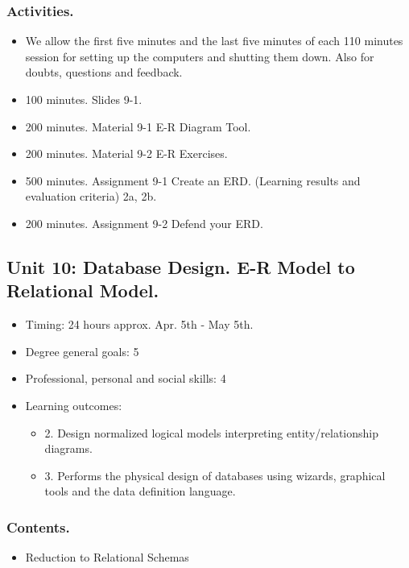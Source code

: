 \documentclass[catalan, a4paper, 12pt, titlepage]{article}
\begin{document}
  \subsubsection{Activities.}
  \begin{itemize}
          \item We allow the first five minutes and the last five minutes of each 110 minutes session for setting up the computers and shutting them down. Also for doubts, questions and feedback.
	  \item 100 minutes. Slides 9-1.
	  \item 200 minutes. Material 9-1 E-R Diagram Tool.
	  \item 200 minutes. Material 9-2 E-R Exercises.
	  \item 500 minutes. Assignment 9-1 Create an ERD. (\faGraduationCap Learning results and evaluation criteria) 2a, 2b.
	  \item 200 minutes. Assignment 9-2 Defend your ERD.
  \end{itemize}


  \subsection{Unit 10: Database Design. E-R Model to Relational Model.}

  \begin{itemize}
	\item Timing: 24 hours approx. Apr. 5th - May 5th.
	\item Degree general goals: 5
	\item Professional, personal and social skills: 4
	\item Learning outcomes: 
		\begin{itemize}
			\item 2. Design normalized logical models interpreting entity/relationship diagrams.
			\item 3. Performs the physical design of databases using wizards, graphical tools and the data definition language.
		\end{itemize}
  \end{itemize}

  \subsubsection{Contents.}
  \begin{itemize}
	\item Reduction to Relational Schemas
  \end{itemize}
\end{document}
